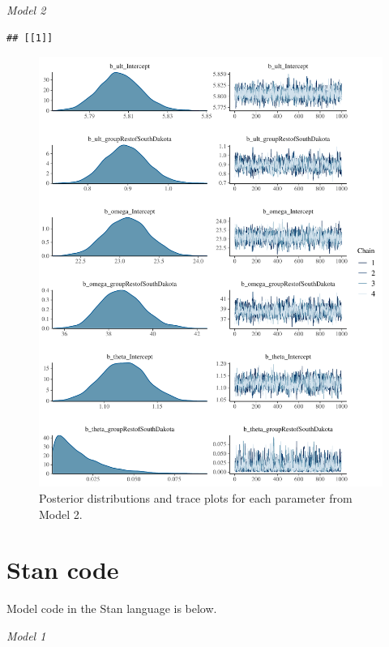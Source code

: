 \documentclass[
]{article}
\begin{document}
\emph{Model 2}

\begin{verbatim}
## [[1]]
\end{verbatim}

\begin{figure}
\centering
\includegraphics{manuscript_updates_after_submittingon7102020_files/figure-latex/unnamed-chunk-9-1.pdf}
\caption{\label{fig:unnamed-chunk-9}Posterior distributions and trace plots for each parameter from Model 2.}
\end{figure}

\newpage

\FloatBarrier

\hypertarget{stan-code}{%
\section{Stan code}\label{stan-code}}

Model code in the Stan language is below.

\emph{Model 1}
\end{document}
